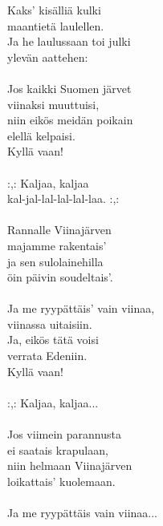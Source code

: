
Kaks' kisälliä kulki \\ maantietä laulellen. \\ Ja he laulussaan toi julki \\ ylevän aattehen: \\ \hspace{10mm} \\ Jos kaikki Suomen järvet \\ viinaksi muuttuisi, \\ niin eikös meidän poikain \\ elellä kelpaisi. \\ Kyllä vaan! \\ \hspace{10mm} \\ :,: Kaljaa, kaljaa \\ kal-jal-lal-lal-lal-laa. :,: \\ \hspace{10mm} \\ Rannalle Viinajärven \\ majamme rakentais' \\ ja sen sulolainehilla \\ öin päivin soudeltais'. \\ \hspace{10mm} \\ Ja me ryypättäis' vain viinaa, \\ viinassa uitaisiin. \\ Ja, eikös tätä voisi \\ verrata Edeniin. \\ Kyllä vaan! \\ \hspace{10mm} \\ :,: Kaljaa, kaljaa... \\ \hspace{10mm} \\ Jos viimein parannusta \\ ei saatais krapulaan, \\ niin helmaan Viinajärven \\ loikattais' kuolemaan. \\ 
\hspace{10mm} \\ 
Ja me ryypättäis vain viinaa...
